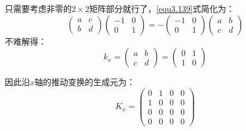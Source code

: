 只需要考虑非零的$2 \times 2$矩阵部分就行了，\ref{equ3.139}式简化为：
\[
	\begin{pmatrix}
		a & c \\
		b & d
	\end{pmatrix}
	\begin{pmatrix}
		-1 & 0 \\
		0 & 1
	\end{pmatrix}
	= -
	\begin{pmatrix}
		-1 & 0 \\
		0 & 1
	\end{pmatrix}
	\begin{pmatrix}
		a & b \\
		c & d
	\end{pmatrix}
\]
不难解得：
\[
	k_x =
		\begin{pmatrix}
			a & b \\
			c & d
		\end{pmatrix}
	=
		\begin{pmatrix}
			0 & 1 \\
			1 & 0
		\end{pmatrix}
\]

因此沿$x$轴的推动变换的生成元为：
\begin{equation}
\label{equ3.141}
	K_x =
		\begin{pmatrix}
			0 & 1 & 0 & 0 \\
			1 & 0 & 0 & 0 \\
			0 & 0 & 0 & 0 \\
			0 & 0 & 0 & 0
		\end{pmatrix}
\end{equation}


